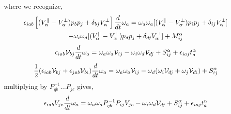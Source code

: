 where we recognize, 
\begin{multline*}
    \epsilon_{iab} \left[
        (V_\alpha^{||} - V_\alpha^\bot)p_bp_j 
        + \delta_{bj} V_\alpha^\bot 
    \right]\frac{d}{d t} \omega_a
    = 
    \omega_a \omega_a [(V_\alpha^{||} - V_\alpha^\bot)
     p_ip_j + \delta_{ij}V_\alpha^{\bot}] \\
     - \omega_i \omega_d[(V_\alpha^{||} - V_\alpha^\bot)
     p_dp_j + \delta_{dj}V_\alpha^{\bot}] 
    + M^\alpha_{ij}
\end{multline*}
\begin{equation*}
    \epsilon_{iab} \mathcal{V}_{bj}\frac{d}{d t} \omega_a
    = 
    \omega_a \omega_a \mathcal{V}_{ij} 
     - \omega_i \omega_d \mathcal{V}_{dj}
    + S^\alpha_{ij}
    + \epsilon_{iaj} t^\alpha_{a}
\end{equation*}
\begin{equation*}
    \frac{1}{2}(\epsilon_{iab} \mathcal{V}_{bj}+\epsilon_{jab} \mathcal{V}_{bi})\frac{d}{d t} \omega_a
    = 
    \omega_a \omega_a \mathcal{V}_{ij} 
     -  \omega_d (\omega_i\mathcal{V}_{dj}+
      \omega_j \mathcal{V}_{di})
    + S^\alpha_{ij}
\end{equation*}
multiplying by $P_{qb}^{-1} \ldots P_{je}$ gives,  
\begin{equation*}
    \epsilon_{iab} V_{je}\frac{d}{d t} \omega_a
    = 
    \omega_a \omega_a  P_{qb}^{-1} P_{ij} V_{je}
     - \omega_i \omega_d \mathcal{V}_{dj}
    + S^\alpha_{ij}
    + \epsilon_{iaj} t^\alpha_{a}
\end{equation*}